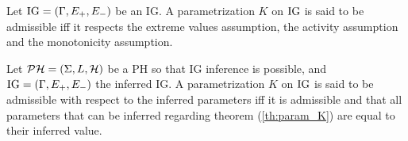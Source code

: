 \begin{definition}
Let $\mathrm{IG} = (\Gamma, E_+, E_-)$ be an IG. A parametrization $K$ on $\mathrm{IG}$ is said to be admissible iff it respects the extreme values assumption, the activity assumption and the monotonicity assumption.
\end{definition}

\begin{definition}
\label{prop:param_enum_inf}
Let $\mathcal{PH} = (\Sigma, L, \mathcal{H})$ be a PH so that IG inference is possible, and $\mathrm{IG} = (\Gamma, E_+, E_-)$ the inferred IG. A parametrization $K$ on $\mathrm{IG}$ is said to be admissible with respect to the inferred parameters iff it is admissible and that all parameters that can be inferred regarding theorem (\ref{th:param_K}) are equal to their inferred value.
\end{definition}



